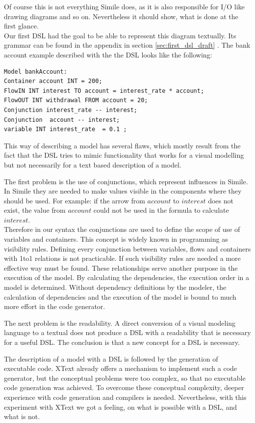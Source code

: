 \par
Of course this is not everything Simile does, as it is also responsible for I/O like drawing diagrams and so on. Nevertheless it should show, what is done at the first glance.\\
Our first DSL had the goal to be able to represent this diagram textually. Its grammar can be found in the appendix in section \ref{sec:first_dsl_draft} . The bank account example described with the the DSL looks like the following:
\begin{lstlisting}
Model bankAccount:
Container account INT = 200;
FlowIN INT interest TO account = interest_rate * account;
FlowOUT INT withdrawal FROM account = 20;
Conjunction interest_rate -- interest;
Conjunction  account -- interest;
variable INT interest_rate  = 0.1 ;
\end{lstlisting}
\par
This way of describing a model has several flaws, which mostly result  from the fact that the DSL tries to mimic functionality that works for a visual modelling but not necessarily for a text based description of a model.
\par
The first problem is the use of conjunctions, which represent influences in Simile. In Simile they are needed to make values visible in the components where they should be used. For example: if the arrow from $account$ to $interest$ does not exist, the value from $account$ could not be used in the formula to calculate $interest$.\\
Therefore in our syntax the conjunctions are used to define the scope of use of variables and containers. This concept is widely known in programming as visibility rules. Defining every conjunction between variables, flows and containers with 1to1 relations is not practicable. If such visibility rules are needed a more effective way must be found.
These relationships serve another purpose in the execution of the model. By calculating the dependencies, the execution order in a model is determined. Without dependency definitions by the modeler, the calculation of dependencies and the execution of the model is bound to much more effort in the code generator.
\par
The next problem is the readability. A direct conversion of a visual modeling language to a textual does not produce a DSL with a readability that is necessary for a useful DSL. The conclusion is that a new concept for a DSL is necessary.
\par
The description of a model with a DSL is followed by the generation of executable code. XText already offers a mechanism to implement such a code generator, but the conceptual problems were too complex, so that no executable code generation was achieved. To overcome these conceptual complexity, deeper experience with code generation and compilers is needed. Nevertheless, with this experiment with XText we got a feeling, on what is possible with a DSL, and what is not. 
